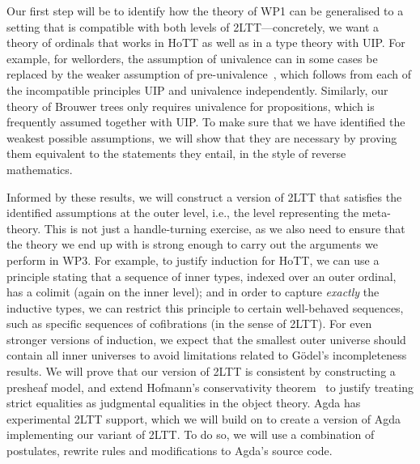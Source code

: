 \documentclass[a4paper,11pt]{article}
\let\oldcite\cite
\renewcommand*\cite[1]{{\protect\NoHyper\oldcite{#1}\protect\endNoHyper}}
\begin{document}
Our first step will be to identify how the theory of WP1 can be generalised to a setting that is compatible with both levels of 2LTT---concretely, we want a theory of ordinals that works in HoTT as well as in a type theory with UIP.
%
For example, for wellorders, the assumption of univalence can in some cases be replaced by the weaker assumption of pre-univalence~\cite{TypeTopologyOrdinals}, which follows from each of the incompatible principles UIP and univalence independently.
%
Similarly, our theory of Brouwer trees only requires univalence for propositions, which is frequently assumed together with UIP.
%
To make sure that we have identified the weakest possible assumptions, we will show that they are necessary by proving them equivalent to the statements they entail, in the style of reverse mathematics.

Informed by these results, we will construct a version of 2LTT that satisfies the identified assumptions at the outer level, i.e., the level representing the meta-theory.
%
This is not just a handle-turning exercise, as we also need to ensure that the theory we end up with is strong enough to carry out the arguments we perform in WP3.
%
For example, to justify induction for HoTT, we can use a principle stating that a sequence of inner types, indexed over an outer ordinal, has a colimit (again on the inner level); and in order to capture \emph{exactly} the inductive types, we can restrict this principle to certain well-behaved sequences, such as specific sequences of cofibrations (in the sense of 2LTT).
%
For even stronger versions of induction, we expect that the smallest outer universe should contain all inner
universes to avoid limitations related to G\"odel's incompleteness results.
%
We will prove that our version of 2LTT is consistent by constructing a presheaf model, and extend Hofmann's conservativity theorem~\cite{hofmann_conservativity} to justify treating strict equalities as judgmental equalities in the object theory.
%
Agda has experimental 2LTT support, which we will build on to create a version of Agda implementing our variant of 2LTT. To do so, we will use a combination of postulates, rewrite rules and modifications to Agda's source code.


\end{document}
